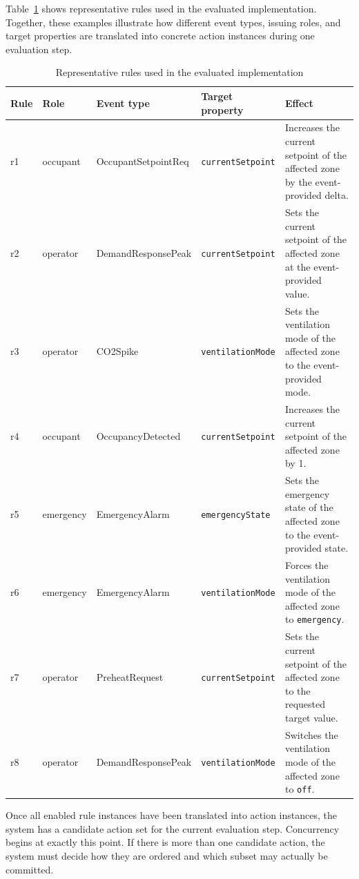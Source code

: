 \documentclass{ieeeaccess}
\theoremstyle{definition}
\theoremstyle{plain}
\theoremstyle{remark}
\begin{document}
Table~\ref{tab:rule-examples} shows representative rules used in the evaluated implementation. Together, these examples illustrate how different event types, issuing roles, and target properties are translated into concrete action instances during one evaluation step.
\begin{table}[h]
\caption{Representative rules used in the evaluated implementation}
\label{tab:rule-examples}
\centering
\begin{tabular}{|p{1.0cm}|p{1.6cm}|p{2.6cm}|p{2.5cm}|p{5.8cm}|}
\hline
\textbf{Rule} & \textbf{Role} & \textbf{Event type} & \textbf{Target property} & \textbf{Effect} \\
\hline
r1 & occupant & OccupantSetpointReq & \texttt{currentSetpoint} & Increases the current setpoint of the affected zone by the event-provided delta. \\
\hline
r2 & operator & DemandResponsePeak & \texttt{currentSetpoint} & Sets the current setpoint of the affected zone at the event-provided value. \\
\hline
r3 & operator & CO2Spike & \texttt{ventilationMode} & Sets the ventilation mode of the affected zone to the event-provided mode. \\
\hline
r4 & occupant & OccupancyDetected & \texttt{currentSetpoint} & Increases the current setpoint of the affected zone by 1. \\
\hline
r5 & emergency & EmergencyAlarm & \texttt{emergencyState} & Sets the emergency state of the affected zone to the event-provided state. \\
\hline
r6 & emergency & EmergencyAlarm & \texttt{ventilationMode} & Forces the ventilation mode of the affected zone to \texttt{emergency}. \\
\hline
r7 & operator & PreheatRequest & \texttt{currentSetpoint} & Sets the current setpoint of the affected zone to the requested target value. \\
\hline
r8 & operator & DemandResponsePeak & \texttt{ventilationMode} & Switches the ventilation mode of the affected zone to \texttt{off}. \\
\hline
\end{tabular}
\end{table}
Once all enabled rule instances have been translated into action instances, the system has a candidate action set for the current evaluation step. Concurrency begins at exactly this point. If there is more than one candidate action, the system must decide how they are ordered and which subset may actually be committed.
\end{document}
